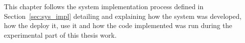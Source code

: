 This chapter follows the system implementation process defined in Section~\ref{sec:sys_impl} detailing and explaining how the system was developed, how the deploy it, use it and how the code implemented was run during the experimental part of this thesis work.